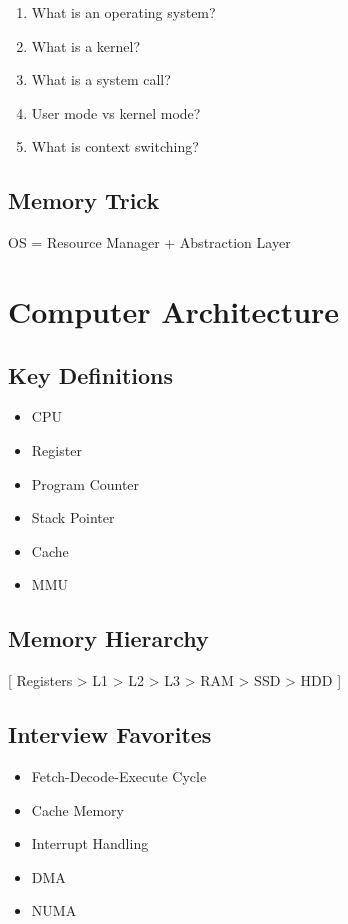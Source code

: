 \begin{enumerate}
\item What is an operating system?
\item What is a kernel?
\item What is a system call?
\item User mode vs kernel mode?
\item What is context switching?
\end{enumerate}

\subsection*{Memory Trick}

OS = Resource Manager + Abstraction Layer

\section{Computer Architecture}

\subsection*{Key Definitions}

\begin{itemize}
\item CPU
\item Register
\item Program Counter
\item Stack Pointer
\item Cache
\item MMU
\end{itemize}

\subsection*{Memory Hierarchy}

[
Registers > L1 > L2 > L3 > RAM > SSD > HDD
]

\subsection*{Interview Favorites}

\begin{itemize}
\item Fetch-Decode-Execute Cycle
\item Cache Memory
\item Interrupt Handling
\item DMA
\item NUMA
\end{itemize}

